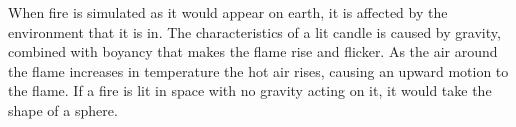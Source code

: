 When fire is simulated as it would appear on earth, it is affected by the environment that it is in. 
The characteristics of a lit candle is caused by gravity, combined with boyancy that makes the flame rise and flicker. 
As the air around the flame increases in temperature the hot air rises, causing an upward motion to the flame.
If a fire is lit in space with no gravity acting on it, it would take the shape of a sphere.
